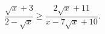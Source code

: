\begin{ex}[type=inequality]
	\begin{condition}
		$\dfrac{\sqrt{x}+  3}{2 - \sqrt{x}}\geqslant\dfrac{2\sqrt{x}+11}{x - 7\sqrt{x} + 10}.$
	\end{condition}
\end{ex}
